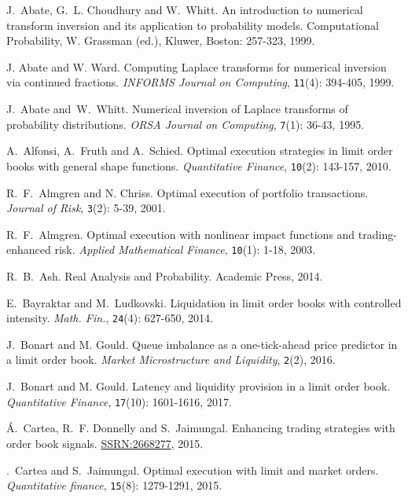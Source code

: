 \documentclass{amsart}[11pt]
\numberwithin{equation}{section}
\theoremstyle{definition}
\begin{document}
\begin{thebibliography}{10}

J.~Abate, G.~L. Choudhury and W.~Whitt.
 An introduction to numerical transform inversion and its application to probability models.
Computational Probability, W. Grassman (ed.), Kluwer, Boston: 257-323, 1999.

J. Abate and W. Ward. 
Computing Laplace transforms for numerical inversion via continued fractions.
\textit{INFORMS Journal on Computing}, {\tt 11}(4): 394-405, 1999.

J.~Abate and~W.~Whitt.
Numerical inversion of Laplace transforms of probability distributions.
\textit{ORSA Journal on Computing}, {\tt 7}(1): 36-43, 1995.

A.~Alfonsi, A.~Fruth and A.~Schied.
Optimal execution strategies in limit order books with general shape functions.
\textit{Quantitative Finance}, {\tt 10}(2): 143-157, 2010.

R.~F.~Almgren and N. Chriss.
Optimal execution of portfolio transactions.
\textit{Journal of Risk}, {\tt 3}(2): 5-39, 2001.

R.~F.~Almgren.
Optimal execution with nonlinear impact functions and trading-enhanced risk.
\textit{Applied Mathematical Finance}, {\tt 10}(1): 1-18, 2003.

R.~B.~Ash.
Real Analysis and Probability.
Academic Press, 2014.

E.~Bayraktar and M.~Ludkovski.
Liquidation in limit order books with controlled intensity.
\textit{Math. Fin.}, {\tt 24}(4): 627-650, 2014.

J.~Bonart and M. Gould.
Queue imbalance as a one-tick-ahead price predictor in a limit order book.
\textit{Market Microstructure and Liquidity}, {\tt 2}(2), 2016.

J.~Bonart and M. Gould.
Latency and liquidity provision in a limit order book.
\textit{Quantitative Finance}, {\tt 17}(10): 1601-1616, 2017.

\'A.~Cartea, R.~F. Donnelly and S.~Jaimungal.
Enhancing trading strategies with order book signals.
\href{https://papers.ssrn.com/sol3/papers.cfm?abstract_id=2668277}{SSRN:2668277}, 2015.

.~Cartea and S.~Jaimungal.
Optimal execution with limit and market orders.
\textit{Quantitative finance}, {\tt 15}(8): 1279-1291, 2015.


\end{thebibliography}
\end{document}
